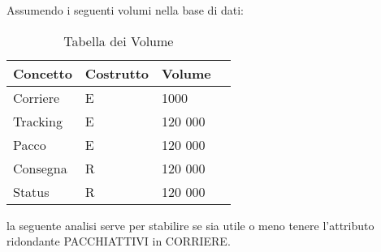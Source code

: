Assumendo i seguenti volumi nella base di dati:

\begin{center}
        \begin{table}[]
        \centering
        \begin{tabular} {|m{4em}|m{10em}|m{15em}|m{7em}|}
        \hline
        \textbf{Concetto} & \textbf{Costrutto} & \textbf{Volume} \\ [0.5ex]
        \hline\hline
            Corriere & E & 1000 \\
            \hline
            Tracking & E & 120 000 \\
            \hline
            Pacco & E & 120 000 \\
            \hline
            Consegna & R & 120 000 \\
            \hline
            Status & R & 120 000 \\
            \hline
           \end{tabular}
            \caption{Tabella dei Volume}
    \end{table}
\end{center}

la seguente analisi serve per stabilire se sia utile o meno tenere l’attributo ridondante
PACCHIATTIVI in CORRIERE.

